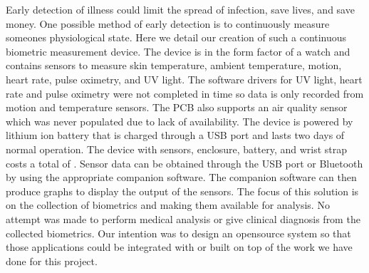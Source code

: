 Early detection of illness could limit the spread of infection, save lives, and
save money.  One possible method of early detection is to continuously measure
someones physiological state.  Here we detail our creation of such a continuous
biometric measurement device.  The device is in the form factor of a watch and
contains sensors to measure skin temperature, ambient temperature, motion, 
heart rate, pulse oximetry, and UV light. The software drivers for UV light,
heart rate and pulse oximetry were not completed in time so data is only
recorded from motion and temperature sensors. The PCB also supports an air
quality sensor which was never populated due to lack of availability.
The device is powered by lithium ion battery that is charged
through a USB port and lasts two days of normal operation.  
The device with sensors, enclosure, battery, and wrist strap costs a total of
\costofboard.  Sensor data can be
obtained through the USB port or Bluetooth by using the appropriate companion
software.  The companion software can then produce graphs to display the output
of the sensors.  The focus of this solution is on the collection of biometrics
and making them available for analysis.  No attempt was made to perform medical
analysis or give clinical diagnosis from the collected biometrics.  Our
intention was to design an opensource system so that those applications could be
integrated with or built on top of the work we have done for this project.

